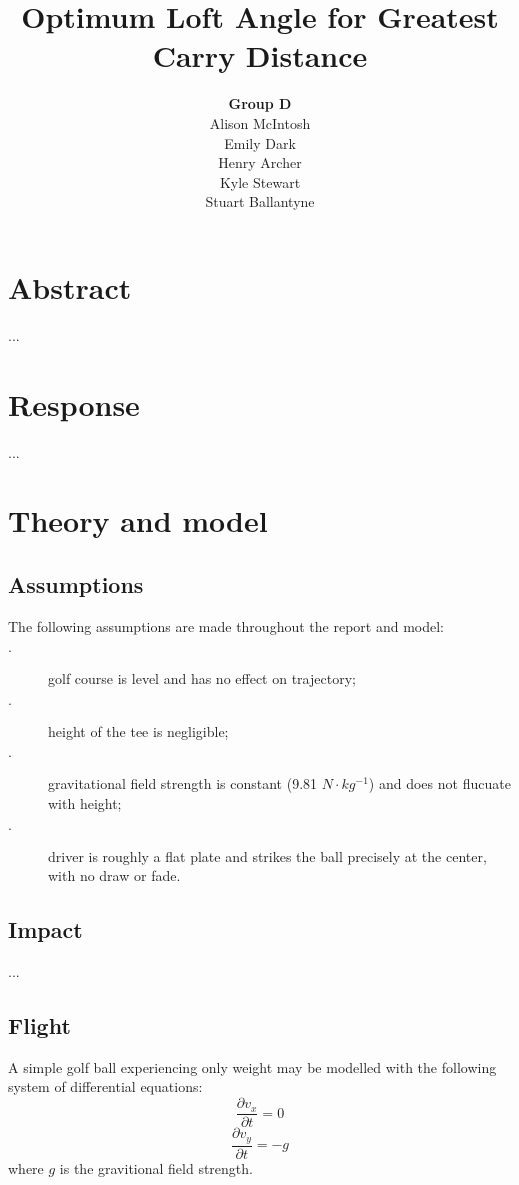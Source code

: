 \documentclass[12pt]{article}
\title{\textbf{Optimum Loft Angle for Greatest Carry Distance}}
\author{\textbf{Group D}\\
		Alison McIntosh\\
		Emily Dark\\
		Henry Archer\\
		Kyle Stewart\\
		Stuart Ballantyne}
\date{}
\begin{document}
\maketitle

\section{Abstract}
...


\section{Response}
...

\section{Theory and model}

\subsection{Assumptions}
The following assumptions are made throughout the report and model:
\begin{description}
  \item[$\cdot$] golf course is level and has no effect on trajectory;
  \item[$\cdot$] height of the tee is negligible;
  \item[$\cdot$] gravitational field strength is constant (9.81 $N\cdot kg^{-1}$) and does not flucuate with height;
  \item[$\cdot$] driver is roughly a flat plate and strikes the ball precisely at the center, with no draw or fade.
\end{description}

\subsection{Impact}
...

\subsection{Flight}
A simple golf ball experiencing only weight may be modelled with the following system of differential equations:
\begin{equation}
\frac{\partial v_x}{\partial t}=0
\end{equation}
\begin{equation}
\frac{\partial v_y}{\partial t}=-g
\end{equation}
where $g$ is the gravitional field strength.
\end{document}

